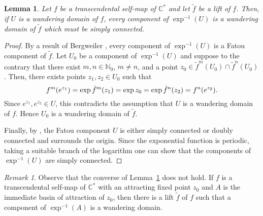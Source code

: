 \documentclass[a4paper, 12pt, reqno]{amsart}
\numberwithin{equation}{section}
\theoremstyle{plain}
\newtheorem{lem}[thm]{Lemma}
\theoremstyle{definition}
\theoremstyle{remark}
\newtheorem{rmk}[thm]{Remark}
\newcommand{\C}{{\mathbb{C}}}
\newcommand{\N}{{\mathbb{N}}}
\begin{document}
\begin{lem}
Let $f$ be a transcendental self-map of $\C^*$ and let $\tilde{f}$ be a lift of $f$. Then, if $U$ is a wandering domain of $f$, every component of $\exp^{-1}(U)$ is a wandering domain of $\tilde{f}$ which must be simply connected.
\label{lem:semiconj-wd}
\end{lem}
\begin{proof}
By a result of Bergweiler \cite{bergweiler95}, every component of $\exp^{-1}(U)$ is a Fatou component of $\tilde{f}$. Let $U_0$ be a component of $\exp^{-1}(U)$ and suppose to the contrary that there exist $m,n\in\N_0$, $m\neq n$, and a point $z_0\in\tilde{f}^m(U_0)\cap \tilde{f}^n(U_0)$. Then, there exists points $z_1,z_2\in U_0$ such that \vspace*{-5pt}
$$
f^m(e^{z_1})=\exp \tilde{f}^m(z_1)=\exp z_0=\exp \tilde{f}^n(z_2)=f^n(e^{z_2}).\vspace*{-5pt}
$$
Since $e^{z_1},e^{z_2}\in U$, this contradicts the assumption that $U$ is a wandering domain of $f$. Hence $U_0$ is a wandering domain of $\tilde{f}$. 

Finally, by \cite[Theorem~1]{baker87}, the Fatou component $U$ is either simply connected or doubly connected and surrounds the origin. Since the exponential function is periodic, taking a suitable branch of the logarithm one can show that the components of $\exp^{-1}(U)$ are simply connected.
\end{proof}

\begin{rmk}
Observe that the converse of Lemma~\ref{lem:semiconj-wd} does not hold. If $f$ is a transcendental self-map of $\C^*$ with an attracting fixed point $z_0$ and $A$ is the immediate basin of attraction of $z_0$, then there is a lift $\tilde{f}$ of $f$ such that a component of $\exp^{-1}(A)$ is a wandering domain.
\end{rmk}
\end{document}
